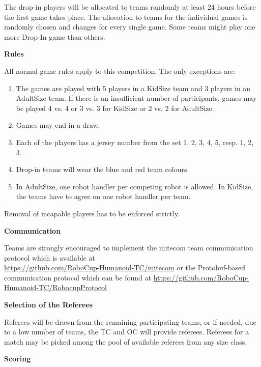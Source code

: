 \bigskip

The drop-in players will be allocated to teams randomly at least 24 hours before
the first game takes place.
The allocation to teams for the individual games is randomly chosen and changes
for every single game.
Some teams might play one more Drop-In game than others.

\bigskip

{\bfseries Rules}

All normal game rules apply to this competition. The only exceptions are:
\begin{enumerate}
\item The games are played with 5 players in a KidSize team
     and 3 players in an AdultSize team.
      If there is an insufficient number of participants,
      games may be played 4 vs. 4 or 3 vs. 3 for KidSize
      or 2 vs. 2 for AdultSize.
\item Games may end in a draw.
\item Each of the players has a jersey number from the set {1, 2, 3, 4, 5},
      resp. {1, 2, 3}.
\item Drop-in teams will wear the blue and red team colours.
\item In AdultSize, one robot handler per competing robot is allowed.
      In KidSize, the teams have to agree on one robot handler per team.
\end{enumerate}

Removal of incapable players has to be enforced strictly.

\bigskip
 
{\bfseries Communication}

Teams are strongly encouraged to implement the mitecom team communication protocol which is available at \\
\url{https://github.com/RoboCup-Humanoid-TC/mitecom} 
or the Protobuf-based communication protocol which can be found at
  \url{https://github.com/RoboCup-Humanoid-TC/RobocupProtocol}

\bigskip
 
{\bfseries Selection of the Referees}

Referees will be drawn from the remaining participating teams, or if needed,
due to a low number of teams, the TC and OC will provide referees.
Referees for a match may be picked among the pool of available referees from any size class.

\bigskip
 
{\bfseries Scoring}

